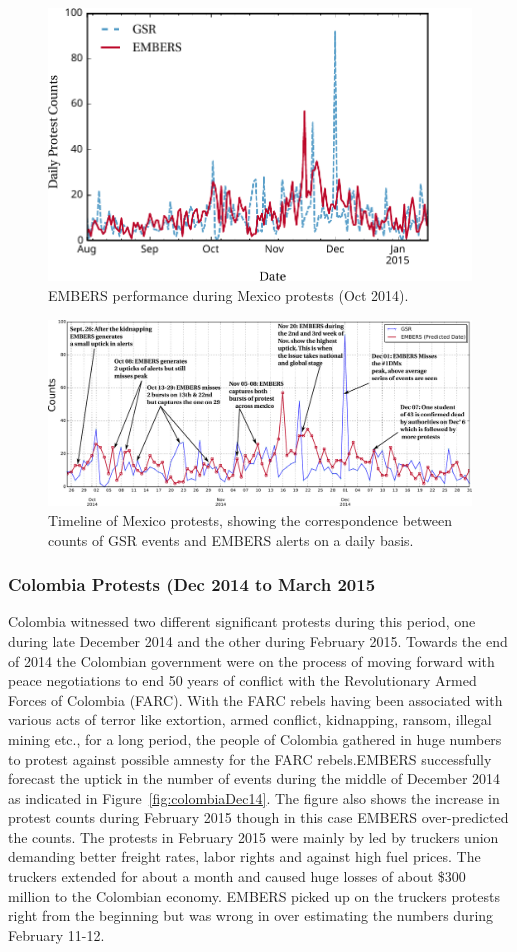 \documentclass[11pt,a4paper,extrafontsizes,oneside]{article}
\begin{document}
\begin{figure} \centering
\includegraphics[width=.8\columnwidth]{mexicoOct14}
\caption{EMBERS performance during Mexico protests (Oct 2014).}
\label{fig:mexicoOct14}
\end{figure}

\begin{figure}
\centering
\includegraphics[width=.8\textwidth]{mx_timeline}
\caption{Timeline of Mexico protests, showing the correspondence
between counts of GSR events and EMBERS alerts on a daily basis.}
\label{fig:mexicoTimeline}
\end{figure}

\subsubsection*{Colombia Protests (Dec 2014 to March 2015}
Colombia witnessed two different significant protests during this period, one during late December 2014
and the other during February 2015. Towards the end of 2014 the Colombian government were on the process
of moving forward with peace negotiations to end 50 years of conflict with the Revolutionary Armed Forces
of Colombia (FARC). With the FARC rebels having been associated with various acts of terror like extortion, armed conflict,
kidnapping, ransom, illegal mining etc., for a long period, the people of Colombia gathered in huge numbers
 to protest against possible amnesty for the FARC rebels.EMBERS successfully forecast the uptick in the number of events during the
middle of December 2014 as indicated in Figure~\ref{fig:colombiaDec14}. The figure also shows the increase in protest counts
during February 2015 though in this case EMBERS over-predicted the counts. The protests in February 2015
were mainly by led by truckers union demanding better freight rates, labor rights and against high fuel prices.
The truckers extended for about a month and caused huge losses of about \$300
million to the Colombian economy.
EMBERS picked up on the truckers protests right from the beginning but was wrong in over estimating the numbers during
February 11-12.
\end{document}
